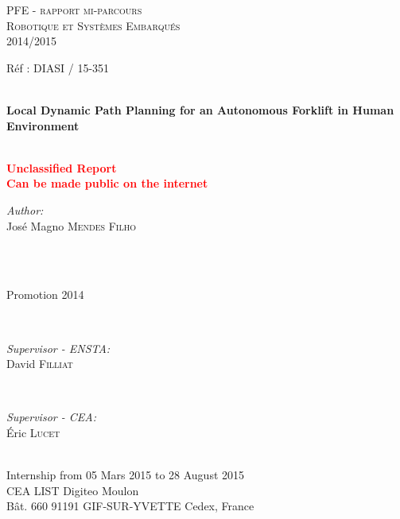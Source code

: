 \begin{titlepage}

\textsc{\LARGE PFE - rapport mi-parcours}\\[0.3cm]
\textsc{\Large Robotique et Systèmes Embarqués}\\[0.3cm]
\Large{2014/2015}\\[0.6cm]


{Réf : DIASI / 15-351 \hfill}

\HRule \\[0.2cm]
\Huge \textbf{Local Dynamic Path Planning for an Autonomous Forklift in Human Environment}\\[-0.2cm] %
\HRule \\[0.5cm]

\begin{center}
\textbf{\textcolor{red}{\Large{
Unclassified Report}\\[-0.4cm]%
\large{Can be made public on the internet}
}}
\end{center}

\begin{minipage}{0.55\textwidth}
\begin{flushleft} \Large
\emph{Author:}\\
José Magno \textsc{Mendes Filho} \\[0.7cm] %
\end{flushleft}
\end{minipage}
~
\begin{minipage}{0.35\textwidth}
\begin{flushright} \Large
\mbox{}\\[0.4cm]
Promotion 2014
\end{flushright}
\end{minipage}\\[1.0cm]

\begin{minipage}{0.45\textwidth}
\begin{flushleft} \large
\emph{Supervisor - ENSTA:}\\
David \textsc{Filliat} %
\end{flushleft}
\end{minipage}
~
\begin{minipage}{0.45\textwidth}
\begin{flushright} \large
\emph{Supervisor - CEA:} \\
Éric \textsc{Lucet} %
\end{flushright}
\end{minipage}\\[1.0cm]

\large{Internship from 05 Mars 2015 to 28 August 2015}\\[0.6cm]
\large{CEA LIST Digiteo Moulon\\ Bât. 660 91191 GIF-SUR-YVETTE Cedex, France}
\end{titlepage}

